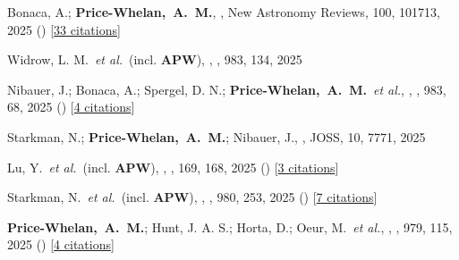 \item[{\color{deemph}\scriptsize143}]Bonaca, A.; \textbf{Price-Whelan,~A.~M.}, , New Astronomy Reviews, 100, 101713, 2025 () [\href{http://adsabs.harvard.edu/abs/2025NewAR.10001713B}{33 citations}]

\item[{\color{deemph}\scriptsize142}]Widrow, L. M.~\textit{et al.}~(incl. \textbf{APW}), , \apj, 983, 134, 2025

\item[{\color{deemph}\scriptsize141}]Nibauer, J.; Bonaca, A.; Spergel, D. N.; \textbf{Price-Whelan,~A.~M.}~\textit{et al.}, , \apj, 983, 68, 2025 () [\href{http://adsabs.harvard.edu/abs/2025ApJ...983...68N}{4 citations}]

\item[{\color{deemph}\scriptsize140}]Starkman, N.; \textbf{Price-Whelan,~A.~M.}; Nibauer, J., , JOSS, 10, 7771, 2025

\item[{\color{deemph}\scriptsize139}]Lu, Y.~\textit{et al.}~(incl. \textbf{APW}), , \aj, 169, 168, 2025 () [\href{http://adsabs.harvard.edu/abs/2025AJ....169..168L}{3 citations}]

\item[{\color{deemph}\scriptsize138}]Starkman, N.~\textit{et al.}~(incl. \textbf{APW}), , \apj, 980, 253, 2025 () [\href{http://adsabs.harvard.edu/abs/2025ApJ...980..253S}{7 citations}]

\item[{\color{deemph}\scriptsize137}]\textbf{Price-Whelan,~A.~M.}; Hunt, J. A. S.; Horta, D.; Oeur, M.~\textit{et al.}, , \apj, 979, 115, 2025 () [\href{http://adsabs.harvard.edu/abs/2025ApJ...979..115P}{4 citations}]


